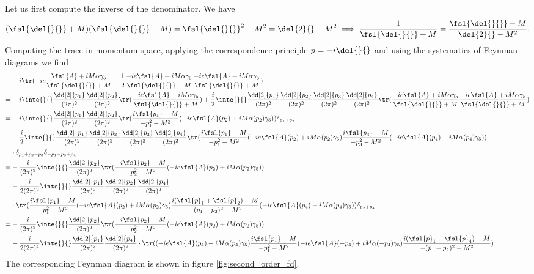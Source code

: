 Let us first compute the inverse of the denominator. We have
\begin{align*}
	(\fsl{\del{}{}} + M)(\fsl{\del{}{}} - M) = \fsl{\del{}{}}^{2} - M^{2} = \del{2}{} - M^{2} \implies \frac{1}{\fsl{\del{}{}} + M} = \frac{\fsl{\del{}{}} - M}{\del{2}{} - M^{2}}.
\end{align*}
Computing the trace in momentum space, applying the correspondence principle $p = -i\del{}{}$ and using the systematics of Feynman diagrams we find
\begin{align*}
	 &-i\tr(-ie\frac{\fsl{A} + iM\alpha\gamma_{5}}{\fsl{\del{}{}} + M} - \frac{1}{2}\frac{-ie\fsl{A} + iM\alpha\gamma_{5}}{\fsl{\del{}{}} + M}\frac{-ie\fsl{A} + iM\alpha\gamma_{5}}{\fsl{\del{}{}} + M}) \\
	=& -i\inte{}{}\frac{\dd[2]{p_{1}}}{(2\pi)^{2}}\frac{\dd[2]{p_{2}}}{(2\pi)^{2}}\tr(\frac{-ie\fsl{A} + iM\alpha\gamma_{5}}{\fsl{\del{}{}} + M}) + \frac{i}{2}\inte{}{}\frac{\dd[2]{p_{1}}}{(2\pi)^{2}}\frac{\dd[2]{p_{2}}}{(2\pi)^{2}}\frac{\dd[2]{p_{3}}}{(2\pi)^{2}}\frac{\dd[2]{p_{4}}}{(2\pi)^{2}}\tr(\frac{-ie\fsl{A} + iM\alpha\gamma_{5}}{\fsl{\del{}{}} + M}\frac{-ie\fsl{A} + iM\alpha\gamma_{5}}{\fsl{\del{}{}} + M}) \\
	=& -i\inte{}{}\frac{\dd[2]{p_{1}}}{(2\pi)^{2}}\frac{\dd[2]{p_{2}}}{(2\pi)^{2}}\tr(\frac{i\fsl{p_{1}} - M}{-p_{1}^{2} - M^{2}}(-ie\fsl{A}(p_{2}) + iM\alpha(p_{2})\gamma_{5}))\delta_{p_{1} + p_{2}} \\
	 &+ \frac{i}{2}\inte{}{}\frac{\dd[2]{p_{1}}}{(2\pi)^{2}}\frac{\dd[2]{p_{2}}}{(2\pi)^{2}}\frac{\dd[2]{p_{3}}}{(2\pi)^{2}}\frac{\dd[2]{p_{4}}}{(2\pi)^{2}}\tr(\frac{i\fsl{p_{1}} - M}{-p_{1}^{2} - M^{2}}(-ie\fsl{A}(p_{2}) + iM\alpha(p_{2})\gamma_{5})\frac{i\fsl{p_{3}} - M}{-p_{3}^{2} - M^{2}}(-ie\fsl{A}(p_{4}) + iM\alpha(p_{4})\gamma_{5})) \\
	 &\cdot\delta_{p_{1} + p_{2} - p_{3}}\delta_{-p_{1} + p_{3} + p_{4}} \\
	=& -\frac{i}{(2\pi)^{2}}\inte{}{}\frac{\dd[2]{p_{2}}}{(2\pi)^{2}}\tr(\frac{-i\fsl{p_{2}} - M}{-p_{2}^{2} - M^{2}}(-ie\fsl{A}(p_{2}) + iM\alpha(p_{2})\gamma_{5})) \\
	 &+ \frac{i}{2(2\pi)^{2}}\inte{}{}\frac{\dd[2]{p_{1}}}{(2\pi)^{2}}\frac{\dd[2]{p_{2}}}{(2\pi)^{2}}\frac{\dd[2]{p_{4}}}{(2\pi)^{2}} \\
	 &\cdot\tr(\frac{i\fsl{p_{1}} - M}{-p_{1}^{2} - M^{2}}(-ie\fsl{A}(p_{2}) + iM\alpha(p_{2})\gamma_{5})\frac{i(\fsl{p}_{1} + \fsl{p}_{2}) - M}{-(p_{1} + p_{2})^{2} - M^{2}}(-ie\fsl{A}(p_{4}) + iM\alpha(p_{4})\gamma_{5}))\delta_{p_{2} + p_{4}} \\
	=&  -\frac{i}{(2\pi)^{2}}\inte{}{}\frac{\dd[2]{p_{2}}}{(2\pi)^{2}}\tr(\frac{-i\fsl{p_{2}} - M}{-p_{2}^{2} - M^{2}}(-ie\fsl{A}(p_{2}) + iM\alpha(p_{2})\gamma_{5})) \\
	&+ \frac{i}{2(2\pi)^{4}}\inte{}{}\frac{\dd[2]{p_{1}}}{(2\pi)^{2}}\frac{\dd[2]{p_{4}}}{(2\pi)^{2}}\cdot\tr((-ie\fsl{A}(p_{4}) + iM\alpha(p_{4})\gamma_{5})\frac{i\fsl{p_{1}} - M}{-p_{1}^{2} - M^{2}}(-ie\fsl{A}(-p_{4}) + iM\alpha(-p_{4})\gamma_{5})\frac{i(\fsl{p}_{1} - \fsl{p}_{4}) - M}{-(p_{1} - p_{4})^{2} - M^{2}}).
\end{align*}
The corresponding Feynman diagram is shown in figure \ref{fig:second_order_fd}.


